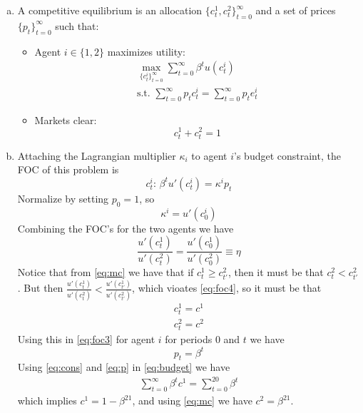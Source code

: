 \documentclass{article}
\begin{document}
\begin{enumerate}[(a)]
  \item A competitive equilibrium is an allocation
    $\{c_t^1,c_t^2\}_{t=0}^\infty$ and a set of prices
    $\{p_t\}_{t=0}^\infty$ such that:
    \begin{itemize}
    \item Agent $i\in\{1,2\}$ maximizes utility:
      \begin{gather}
        \max_{\{c_t^i\}_{t=0}^\infty}\sum_{t=0}^\infty\beta^tu(c_t^i)\nonumber\\
        \text{s.t. }\sum_{t=0}^\infty p_tc_t^i=\sum_{t=0}^\infty p_te_t^i\label{eq:budget}
      \end{gather}
    \item Markets clear:
      \begin{equation}
        \label{eq:mc}
        c_t^1+c_t^2=1
      \end{equation}
    \end{itemize}

  \item Attaching the Lagrangian multiplier $\kappa_i$ to agent $i$'s budget constraint, the FOC of this problem is
    \begin{equation}
      \label{eq:foc3}
      c_t^i :\, \beta^tu'(c_t^i)=\kappa^ip_t
    \end{equation}
    Normalize by setting $p_0=1$, so
    \begin{equation*}
      \kappa^i=u'(c_0^i)
    \end{equation*}
    Combining the FOC's for the two agents we have
    \begin{equation}
      \label{eq:foc4}
      \frac{u'(c_t^1)}{u'(c_t^2)}=\frac{u'(c_0^1)}{u'(c_0^2)}\equiv\eta
    \end{equation}
    Notice that from \eqref{eq:mc} we have that if
    $c_t^1\ge c_{t'}^2$, then it must be that $c_t^2<c_{t'}^2$. But
    then
    $\frac{u'(c_t^1)}{u'(c_t^2)}<\frac{u'(c_{t'}^1)}{u'(c_{t'}^2)}$,
    which vioates \eqref{eq:foc4}, so it must be that
    \begin{equation}
      \label{eq:cons}
      \begin{aligned}
        c_t^1=c^1\\
        c_t^2=c^2
      \end{aligned}
    \end{equation}
    Using this in \eqref{eq:foc3} for agent $i$ for periods $0$ and $t$ we have
    \begin{equation}
      \label{eq:p}
      p_t=\beta^t
    \end{equation}
    Using \eqref{eq:cons} and \eqref{eq:p} in \eqref{eq:budget} we have
      \begin{gather*}
        \sum_{t=0}^\infty \beta^tc^1=\sum_{t=0}^{20} \beta^t
      \end{gather*}
      which implies $c^1=1-\beta^{21}$, and using \eqref{eq:mc} we
      have $c^2=\beta^{21}$.


\end{enumerate}
\end{document}
